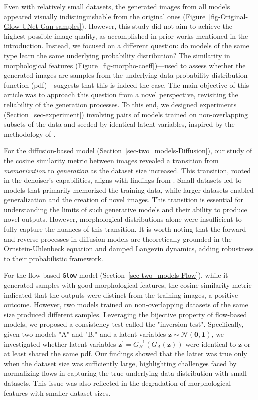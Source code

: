 \documentclass[fleqn,usenatbib]{mnras}
\begin{document}
Even with relatively small datasets, the generated images from all models appeared visually indistinguishable from the original ones (Figure~\ref{fig-Original-Glow-UNet-Gan-samples}). However, this study did not aim to achieve the highest possible image quality, as accomplished in prior works mentioned in the introduction. Instead, we focused on a different question: do models of the same type learn the same underlying probability distribution? The similarity in morphological features (Figure~\ref{fig-morpho-coeff})—used to assess whether the generated images are samples from the underlying data probability distribution function (pdf)—suggests that this is indeed the case. The main objective of this article was to approach this question from a novel perspective, revisiting the reliability of the generation processes. To this end, we designed experiments (Section~\ref{sec-experiment}) involving pairs of models trained on non-overlapping subsets of the data and seeded by identical latent variables, inspired by the methodology of \cite{kadkhodaie2024generalization}.

For the diffusion-based model (Section~\ref{sec-two_models-Diffusion}), our study of the cosine similarity metric between images revealed a transition from \textit{memorization} to \textit{generation} as the dataset size increased. This transition, rooted in the denoiser's capabilities, aligns with findings from \cite{kadkhodaie2024generalization}. Small datasets led to models that primarily memorized the training data, while larger datasets enabled generalization and the creation of novel images. This transition is essential for understanding the limits of such generative models and their ability to produce novel outputs. However, morphological distributions alone were insufficient to fully capture the nuances of this transition. It is worth noting that the forward and reverse processes in diffusion models are theoretically grounded in the Ornstein-Uhlenbeck equation and damped Langevin dynamics, adding robustness to their probabilistic framework.

For the flow-based \texttt{Glow} model (Section~\ref{sec-two_models-Flow}), while it generated samples with good morphological features, the cosine similarity metric indicated that the outputs were distinct from the training images, a positive outcome. However, two models trained on non-overlapping datasets of the same size produced different samples. Leveraging the bijective property of flow-based models, we proposed a consistency test called the "inversion test". Specifically, given two models "A" and "B," and a latent variables \(\bm{z} \sim \mathcal{N}(\bm{0}, \bm{1})\), we investigated whether latent variables \(\bm{z}^\prime = G_B^{-1}(G_A(\bm{z}))\) were identical to \(\bm{z}\) or at least shared the same pdf. Our findings showed that the latter was true only when the dataset size was sufficiently large, highlighting challenges faced by normalizing flows in capturing the true underlying data distribution with small datasets. This issue was also reflected in the degradation of morphological features with smaller dataset sizes.
\end{document}
